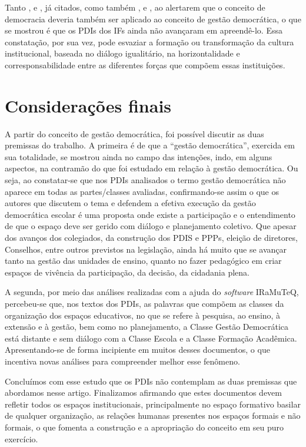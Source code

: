 \documentclass[portuguese]{textolivre}
\begin{document}
Tanto \textcite{paro_gestao_1998}, \textcite{dourado_gestao_2003} e \textcite{luck_gestao_2006}, já citados, como também \textcite{boas_filho_democracia:_2013}, \textcite{lourenco_dos_2019} e \textcite{pogrebinschi_entre_2010}, ao alertarem que o conceito de democracia deveria também ser aplicado ao conceito de gestão democrática, o que se mostrou é que os PDIs dos IFs ainda não avançaram em apreendê-lo. Essa constatação, por sua vez, pode esvaziar a formação ou transformação da cultura institucional, baseada no diálogo igualitário, na horizontalidade e corresponsabilidade entre as diferentes forças que compõem essas instituições.

\section{Considerações finais}\label{sec-organizacao}
A partir do conceito de gestão democrática, foi possível discutir as duas premissas do trabalho. A primeira é de que a “gestão democrática”, exercida em sua totalidade, se mostrou ainda no campo das intenções, indo, em alguns aspectos, na contramão do que foi estudado em relação à gestão democrática. Ou seja, ao constatar-se que nos PDIs analisados o termo gestão democrática não aparece em todas as partes/classes avaliadas, confirmando-se assim o que os autores que discutem o tema e defendem a efetiva execução da gestão democrática escolar é uma proposta onde existe a participação e o entendimento de que o espaço deve ser gerido com diálogo e planejamento coletivo. Que apesar dos avanços dos colegiados, da construção dos PDIS e PPPs, eleição de diretores, Conselhos, entre outros previstos na legislação, ainda há muito que se avançar tanto na gestão das unidades de ensino, quanto no fazer pedagógico em criar espaços de vivência da participação, da decisão, da cidadania plena.

A segunda, por meio das análises realizadas com a ajuda do \textit{software} IRaMuTeQ, percebeu-se que, nos textos dos PDIs, as palavras que compõem as classes da organização dos espaços educativos, no que se refere à pesquisa, ao ensino, à extensão e à gestão, bem como no planejamento, a Classe Gestão Democrática está distante e sem diálogo com a Classe Escola e a Classe Formação Acadêmica. Apresentando-se de forma incipiente em muitos desses documentos, o que incentiva novas análises para compreender melhor esse fenômeno.

Concluímos com esse estudo que os PDIs não contemplam as duas premissas que abordamos nesse artigo. Finalizamos afirmando que estes documentos devem refletir todos os espaços institucionais, principalmente no espaço formativo basilar de qualquer organização, as relações humanas presentes nos espaços formais e não formais, o que fomenta a construção e a apropriação do conceito em seu puro exercício.
\end{document}
